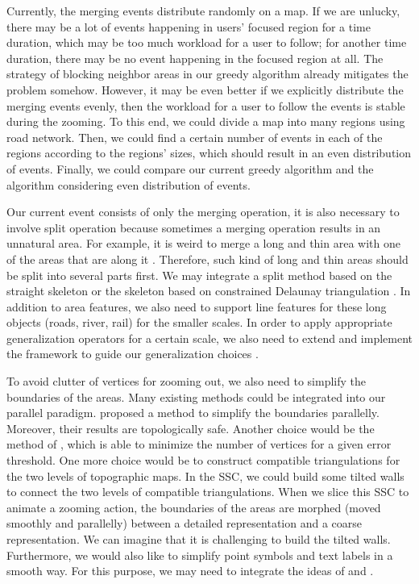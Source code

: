\documentclass[ijgi,article,submit,moreauthors,pdftex]{Definitions/mdpi}
\begin{document}
Currently, the merging events distribute randomly on a map.
If we are unlucky, there may be a lot of events happening in users' focused region
for a time duration,
which may be too much workload for a user to follow;
for another time duration, there may be no event happening in the focused region at all.
The strategy of blocking neighbor areas in our greedy algorithm 
already mitigates the problem somehow.
However, it may be even better if 
we explicitly distribute the merging events evenly, 
then the workload for a user to follow the events is stable during the zooming.
To this end, we could divide a map into many regions using road network.
Then, we could find a certain number of events in each of the regions according to
the regions' sizes,
which should result in an even distribution of events.
Finally, we could compare our current greedy algorithm and 
the algorithm considering even distribution of events.


Our current event consists of only the merging operation,
it is also necessary to involve split operation
because sometimes a merging operation results in an unnatural area.
For example, it is weird to merge a long and thin area 
with one of the areas that are along it
\citep[see][]{Haunert2008Skeleton}.
Therefore, such kind of long and thin areas should be
split into several parts first.
We may integrate a split method based on the straight skeleton
\citep{Haunert2008Skeleton}
or the skeleton based on constrained Delaunay triangulation
\citep{Meijers2016Split}.
In addition to area features, we also need to support line features 
for these long objects (roads, river, rail) for the smaller scales.
In order to apply appropriate generalization operators
for a certain scale,
we also need to extend and implement the framework 
to guide our generalization choices
\citep{Meijers2018Framework}.




To avoid clutter of vertices for zooming out, 
we also need to simplify the boundaries of the areas.
Many existing methods could be integrated into our parallel paradigm.
\citet{Meijers2011LineSimp} proposed a method 
to simplify the boundaries parallelly. 
Moreover, their results are topologically safe. 
Another choice would be the method of \citet{ImaiIri1988},
which is able to minimize the number of vertices 
for a given error threshold.
One more choice would be to construct compatible triangulations 
\citep[see][]{Peng2019Thesis}
for the two levels of topographic maps.
In the SSC, we could build some tilted walls 
to connect the two levels of compatible triangulations.
When we slice this SSC to animate a zooming action,
the boundaries of the areas are morphed (moved smoothly and parallelly)
between a detailed representation and a coarse representation.
We can imagine that it is challenging to build the tilted walls.
Furthermore, we would also like to simplify point symbols and text labels
in a smooth way.
For this purpose, we may need to integrate the ideas of
\citet{Haunert2017Label} and \citet{sahw-oarps-ICAGW13}.
\end{document}

